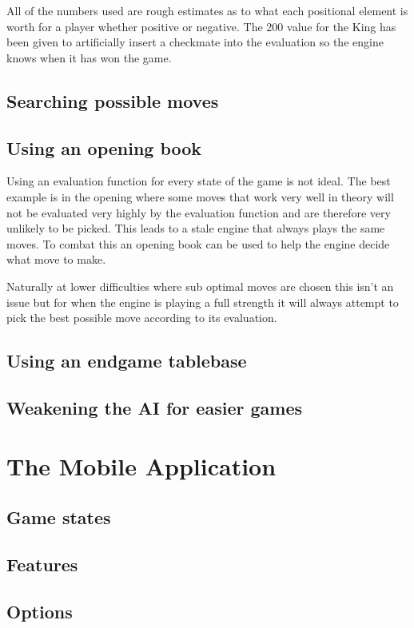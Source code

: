\documentclass[11pt]{report}
\begin{document}
All of the numbers used are rough estimates as to what each positional element is worth for a player whether positive or negative. The 200 value for the King has been given to artificially insert a checkmate into the evaluation so the engine knows when it has won the game. 

\section{Searching possible moves}

\section{Using an opening book}

Using an evaluation function for every state of the game is not ideal. The best example is in the opening where some moves that work very well in theory will not be evaluated very highly by the evaluation function and are therefore very unlikely to be picked. This leads to a stale engine that always plays the same moves. To combat this an opening book can be used to help the engine decide what move to make. \newline

Naturally at lower difficulties where sub optimal moves are chosen this isn't an issue but for when the engine is playing a full strength it will always attempt to pick the best possible move according to its evaluation.

\section{Using an endgame tablebase}

\section{Weakening the AI for easier games}


\chapter{The Mobile Application}

\section{Game states}

\section{Features}

\section{Options}
\end{document}
